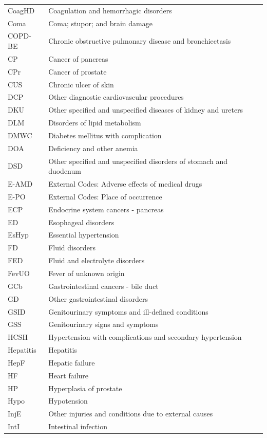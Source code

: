 {\begin{longtable}{ll}
CoagHD & Coagulation and hemorrhagic disorders \\
Coma & Coma; stupor; and brain damage \\
COPD-BE & Chronic obstructive pulmonary disease and bronchiectasis \\
CP & Cancer of pancreas \\
CPr & Cancer of prostate \\
CUS & Chronic ulcer of skin \\
DCP & Other diagnostic cardiovascular procedures \\
DKU & Other specified and unspecified diseases of kidney and ureters \\
DLM & Disorders of lipid metabolism \\
DMWC & Diabetes mellitus with complication \\
DOA & Deficiency and other anemia \\
DSD & Other specified and unspecified disorders of stomach and duodenum \\
E-AMD & External Codes: Adverse effects of medical drugs \\
E-PO & External Codes: Place of occurrence \\
ECP & Endocrine system cancers - pancreas \\
ED & Esophageal disorders \\
EsHyp & Essential hypertension \\
FD & Fluid disorders \\
FED & Fluid and electrolyte disorders \\
FevUO & Fever of unknown origin \\
GCb & Gastrointestinal cancers - bile duct \\
GD & Other gastrointestinal disorders \\
GSID & Genitourinary symptoms and ill-defined conditions \\
GSS & Genitourinary signs and symptoms \\
HCSH & Hypertension with complications and secondary hypertension \\
Hepatitis & Hepatitis \\
HepF & Hepatic failure \\
HF & Heart failure \\
HP & Hyperplasia of prostate \\
Hypo & Hypotension \\
InjE & Other injuries and conditions due to external causes \\
IntI & Intestinal infection \\

\end{longtable}}
